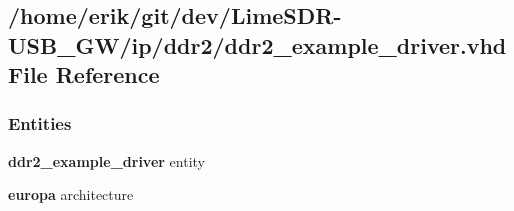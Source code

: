 \subsection{/home/erik/git/dev/\+Lime\+S\+D\+R-\/\+U\+S\+B\+\_\+\+G\+W/ip/ddr2/ddr2\+\_\+example\+\_\+driver.vhd File Reference}
\label{ddr2__example__driver_8vhd}
\subsubsection*{Entities}
\begin{DoxyCompactItemize}
\item 
{\bf ddr2\+\_\+example\+\_\+driver} entity
\item 
{\bf europa} architecture
\end{DoxyCompactItemize}
